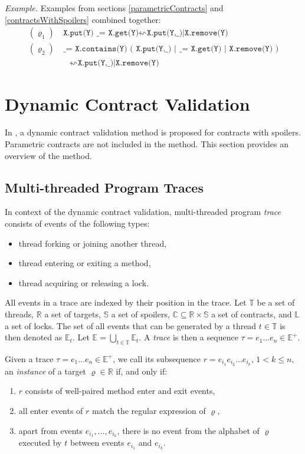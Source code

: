 \emph{Example.} Examples from sections \ref{parametricContracts} and
\ref{contractsWithSpoilers} combined together:
\begin{align*}
    (\varrho_1) &\ \texttt{X.put(Y) \_ = X.get(Y)} \leftsquigarrow
    \texttt{X.put(Y,\_)|X.remove(Y)}\\
    (\varrho_2) &\ \texttt{\_ = X.contains(Y) ( X.put(Y,\_) | \_ = X.get(Y) |
    X.remove(Y) )}\\
    &\quad \leftsquigarrow \texttt{X.put(Y,\_)|X.remove(Y)}
\end{align*}


\section{Dynamic Contract Validation}

In \cite{contracts}, a dynamic contract validation method is proposed for
contracts with spoilers. Parametric contracts are not included in the method.
This section provides an overview of the method.

\subsection{Multi-threaded Program Traces}

In context of the dynamic contract validation, multi-threaded program
\emph{trace} consists of events of the following types:
\begin{itemize}
    \item thread forking or joining another thread,
    \item thread entering or exiting a method,
    \item thread acquiring or releasing a lock.
\end{itemize}

All events in a trace are indexed by their position in the trace. Let
$\mathbb{T}$ be a set of threads, $\mathbb{R}$ a set of targets, $\mathbb{S}$ a
set of spoilers, $\mathbb{C} \subseteq \mathbb{R} \times \mathbb{S}$ a set of
contracts, and $\mathbb{L}$ a set of locks. The set of all events that can be
generated by a thread $t \in \mathbb{T}$ is then denoted as $\mathbb{E}_t$. Let
$\mathbb{E} = \bigcup_{t \in \mathbb{T}} \mathbb{E}_t$. A \emph{trace} is then a
sequence $\tau = e_1 \hdots e_n \in \mathbb{E}^+$.


Given a trace $\tau = e_1 \hdots e_n \in \mathbb{E}^+$, we call its subsequence
$r = e_{i_1} e_{i_2} \hdots e_{i_k}$, $1 < k \leq n$, an \emph{instance} of a
target $\varrho \in \mathbb{R}$ if, and only if:
\begin{enumerate}
    \item $r$ consists of well-paired method enter and exit events,
    \item all enter events of $r$ match the regular expression of $\varrho$,
    \item apart from events $e_{i_1},\ldots,e_{i_k}$, there is no event from the
        alphabet of $\varrho$ executed by $t$ between events $e_{i_1}$ and
        $e_{i_k}$.
\end{enumerate}

